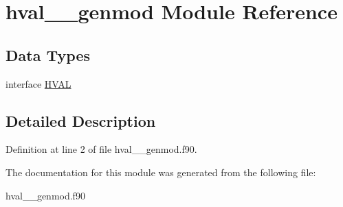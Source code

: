 \hypertarget{classhval____genmod}{\section{hval\+\_\+\+\_\+genmod Module Reference}
\label{classhval____genmod}
}
\subsection*{Data Types}
\begin{DoxyCompactItemize}
\item 
interface \hyperlink{interfacehval____genmod_1_1_h_v_a_l}{H\+V\+A\+L}
\end{DoxyCompactItemize}


\subsection{Detailed Description}


Definition at line 2 of file hval\+\_\+\+\_\+genmod.\+f90.



The documentation for this module was generated from the following file\+:\begin{DoxyCompactItemize}
\item 
hval\+\_\+\+\_\+genmod.\+f90\end{DoxyCompactItemize}
